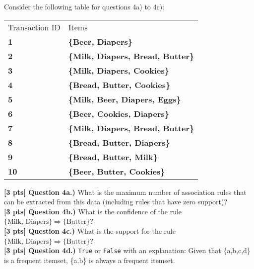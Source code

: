 \documentclass[paper=a4, fontsize=11pt]{scrartcl} %
\begin{document}
Consider the following table for questions 4a) to 4c):\\
\begin{center}
\begin{tabular}{ll}
Transaction ID & Items \\
\rowcolor[HTML]{DEEBF6} 
\textbf{1}     & \textbf{\{Beer, Diapers\}} \\
\rowcolor[HTML]{DEEBF6} 
\textbf{2}     & \textbf{\{Milk, Diapers, Bread, Butter\}} \\
\rowcolor[HTML]{DEEBF6} 
\textbf{3}     & \textbf{\{Milk, Diapers, Cookies\}} \\
\rowcolor[HTML]{DEEBF6} 
\textbf{4}     & \textbf{\{Bread, Butter, Cookies\}} \\
\rowcolor[HTML]{DEEBF6} 
\textbf{5}     & \textbf{\{Milk, Beer, Diapers, Eggs\}} \\
\rowcolor[HTML]{DEEBF6} 
\textbf{6}     & \textbf{\{Beer, Cookies, Diapers\}} \\
\rowcolor[HTML]{DEEBF6} 
\textbf{7}     & \textbf{\{Milk, Diapers, Bread, Butter\}} \\
\rowcolor[HTML]{DEEBF6} 
\textbf{8}     & \textbf{\{Bread, Butter, Diapers\}} \\
\rowcolor[HTML]{DEEBF6} 
\textbf{9}     & \textbf{\{Bread, Butter, Milk\}} \\
\rowcolor[HTML]{DEEBF6} 
\textbf{10}    & \textbf{\{Beer, Butter, Cookies\}}    
\end{tabular}
\end{center}

\vspace{8mm}

\textbf{[3 pts] Question 4a.)} What is the maximum number of association rules that can be extracted from this data (including rules that have zero support)? \\

\textbf{[3 pts] Question 4b.)} What is the confidence of the rule $\{ \text{Milk, Diapers} \} \Rightarrow \{ \text{Butter} \}$? \\

\textbf{[3 pts] Question 4c.)} What is the support for the rule $\{ \text{Milk, Diapers} \} \Rightarrow \{ \text{Butter} \}$? \\

\textbf{[3 pts] Question 4d.)} \verb"True" or \verb"False" with an explanation: Given that \{a,b,c,d\} is a frequent itemset, \{a,b\} is always a frequent itemset. \\
\end{document}
